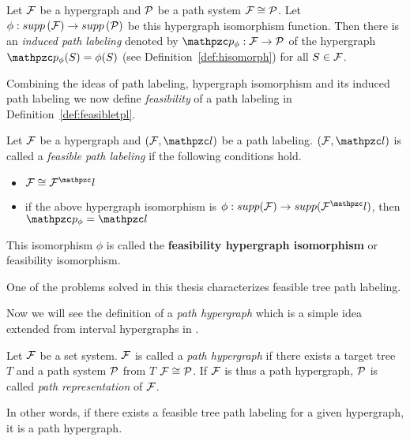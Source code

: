 \begin{definition}
  \label{def:inducedpl}
  Let ${\cal F}$ be a hypergraph and ${\cal P}$ be a path system \stt ${\cal F} \cong
  {\cal P}$. Let  $\phi: supp\left({\cal F}\right) \rightarrow supp\left({\cal P}\right)$ be this hypergraph
  isomorphism function. %
  Then there is an {\em induced path labeling} %
  denoted by $\cp_\phi: \cF \rightarrow \cP$
  of the hypergraph \stt %
  $\cp_\phi(S) = \phi(S)$
  (see Definition~\ref{def:hisomorph}) for all $S \in {\cal F}$.  
\end{definition}

Combining the ideas of path labeling, hypergraph isomorphism and its
induced path labeling we now define {\em feasibility} of a path
labeling in Definition~\ref{def:feasibletpl}.

\begin{definition}
  \label{def:feasibletpl}
  Let ${\cal F}$ be a hypergraph and $(\cF, \cl)$ be a path
  labeling. $(\cF, \cl)$ is called a {\em feasible path labeling} if
  the following conditions hold.
  \begin{itemize}
  \item $\cF \cong \cF^\cl$
  \item if the above hypergraph isomorphism is $\phi: supp(\cF)
    \rightarrow supp(\cF^\cl)$, then $\cp_\phi = \cl$
  \end{itemize}


  This isomorphism $\phi$ is called the \textbf{feasibility hypergraph
  isomorphism} or feasibility isomorphism.
\end{definition}

One of the problems solved in this thesis \FTPL characterizes
feasible tree path labeling.

Now we will see the definition of a {\em path hypergraph} which is a
simple idea extended from interval hypergraphs in \cite{kklv10}. 

\begin{definition}
  \label{def:pathhypergraph}
  Let ${\cal F}$ be a set system. ${\cal F}$ is called a {\em path hypergraph}
  if there exists a target tree $T$ and a path system ${\cal P}$ from $T$
  \stt ${\cal F} \cong {\cal P}$. If ${\cal F}$ is thus a path hypergraph, ${\cal P}$ is
  called {\em path representation} of ${\cal F}$.
\end{definition}

In other words, if there exists a feasible tree path labeling for a
given hypergraph, it is a path hypergraph.


